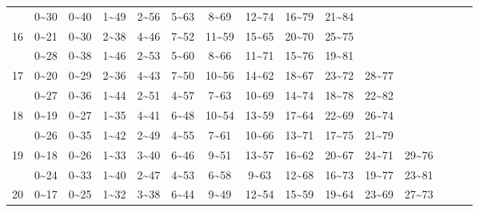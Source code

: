\documentclass[lang=cn,10pt]{elegantbook}
\begin{document}
\begin{longtable}{c|cccccccccccccc}
       & 0\textasciitilde30 & 0\textasciitilde40 & 1\textasciitilde49 & 2\textasciitilde56 & 5\textasciitilde63 & 8\textasciitilde69 & 12\textasciitilde74 & 16\textasciitilde79 & 21\textasciitilde84 & & & & & \\
    16 & 0\textasciitilde21 & 0\textasciitilde30 & 2\textasciitilde38 & 4\textasciitilde46 & 7\textasciitilde52 & 11\textasciitilde59 & 15\textasciitilde65 & 20\textasciitilde70 & 25\textasciitilde75 & & & & & \\
       & 0\textasciitilde28 & 0\textasciitilde38 & 1\textasciitilde46 & 2\textasciitilde53 & 5\textasciitilde60 & 8\textasciitilde66 & 11\textasciitilde71 & 15\textasciitilde76 & 19\textasciitilde81 & & & & & \\
    17 & 0\textasciitilde20 & 0\textasciitilde29 & 2\textasciitilde36 & 4\textasciitilde43 & 7\textasciitilde50 & 10\textasciitilde56 & 14\textasciitilde62 & 18\textasciitilde67 & 23\textasciitilde72 & 28\textasciitilde77 & & & & \\
       & 0\textasciitilde27 & 0\textasciitilde36 & 1\textasciitilde44 & 2\textasciitilde51 & 4\textasciitilde57 & 7\textasciitilde63 & 10\textasciitilde69 & 14\textasciitilde74 & 18\textasciitilde78 & 22\textasciitilde82 & & & & \\
    18 & 0\textasciitilde19 & 0\textasciitilde27 & 1\textasciitilde35 & 4\textasciitilde41 & 6\textasciitilde48 & 10\textasciitilde54 & 13\textasciitilde59 & 17\textasciitilde64 & 22\textasciitilde69 & 26\textasciitilde74 & & & & \\
       & 0\textasciitilde26 & 0\textasciitilde35 & 1\textasciitilde42 & 2\textasciitilde49 & 4\textasciitilde55 & 7\textasciitilde61 & 10\textasciitilde66 & 13\textasciitilde71 & 17\textasciitilde75 & 21\textasciitilde79 & & & & \\
    19 & 0\textasciitilde18 & 0\textasciitilde26 & 1\textasciitilde33 & 3\textasciitilde40 & 6\textasciitilde46 & 9\textasciitilde51 & 13\textasciitilde57 & 16\textasciitilde62 & 20\textasciitilde67 & 24\textasciitilde71 & 29\textasciitilde76 & & & \\
       & 0\textasciitilde24 & 0\textasciitilde33 & 1\textasciitilde40 & 2\textasciitilde47 & 4\textasciitilde53 & 6\textasciitilde58 & 9\textasciitilde63 & 12\textasciitilde68 & 16\textasciitilde73 & 19\textasciitilde77 & 23\textasciitilde81 & & & \\
    20 & 0\textasciitilde17 & 0\textasciitilde25 & 1\textasciitilde32 & 3\textasciitilde38 & 6\textasciitilde44 & 9\textasciitilde49 & 12\textasciitilde54 & 15\textasciitilde59 & 19\textasciitilde64 & 23\textasciitilde69 & 27\textasciitilde73 & & & \\

\end{longtable}
\end{document}

